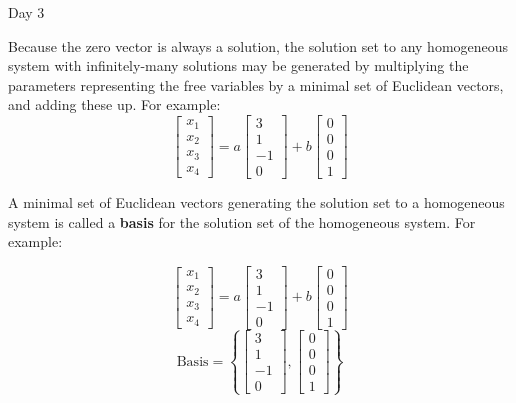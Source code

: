 \begin{applicationActivities}{Day 3}
\begin{fact}
  Because the zero vector is always a solution,
  the solution set to any homogeneous system with infinitely-many solutions
  may be generated by multiplying the parameters representing the free variables
  by a minimal set of Euclidean vectors, and adding these up. For example:
  \[
    \begin{bmatrix}
      x_1 \\
      x_2 \\
      x_3 \\
      x_4
    \end{bmatrix}=
    a\begin{bmatrix}
      3 \\
      1 \\
      -1 \\
      0
    \end{bmatrix}+
    b\begin{bmatrix}
      0 \\
      0 \\
      0 \\
      1
    \end{bmatrix}
  \]
\end{fact}

\begin{definition}
  A minimal set of Euclidean vectors generating the solution set to a
  homogeneous system is called a \textbf{basis} for the solution
  set of the homogeneous system. For example:
  \begin{multicols}{2}\noindent
  \[
    \begin{bmatrix}
      x_1 \\
      x_2 \\
      x_3 \\
      x_4
    \end{bmatrix}=
    a\begin{bmatrix}
      3 \\
      1 \\
      -1 \\
      0
    \end{bmatrix}+
    b\begin{bmatrix}
      0 \\
      0 \\
      0 \\
      1
    \end{bmatrix}
  \]
  \[
    \textrm{Basis}=\left\{
    \begin{bmatrix}
      3 \\
      1 \\
      -1 \\
      0
    \end{bmatrix},
    \begin{bmatrix}
      0 \\
      0 \\
      0 \\
      1
    \end{bmatrix}\right\}
  \]
  \end{multicols}
\end{definition}


\end{applicationActivities}
